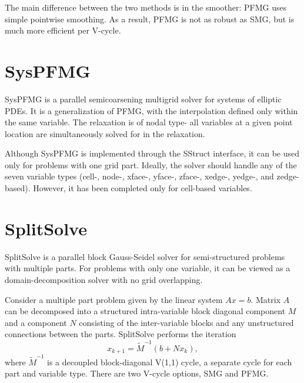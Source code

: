The main difference between the two methods is in the smoother: PFMG
uses simple pointwise smoothing.  As a result, PFMG is not as robust
as SMG, but is much more efficient per V-cycle.

                                                                                                                                                             
\section{SysPFMG}

SysPFMG is a parallel semicoarsening multigrid solver for systems of 
elliptic PDEs. It is a generalization of PFMG, with the interpolation
defined only within the same variable. The relaxation is of nodal type-
all variables at a given point location are simultaneously solved for in the
relaxation.

Although SysPFMG is implemented through the SStruct interface, it can
be used only for problems with one grid part. Ideally, the solver should
handle any of the seven variable types (cell-, node-, xface-, yface-, zface-,
xedge-, yedge-, and zedge-based). However, it has been completed only for cell-based
variables.


\section{SplitSolve}
                                                                                                                                                             
SplitSolve is a parallel block Gauss-Seidel solver for semi-structured
problems with multiple parts. For problems with only one variable, it can be viewed as 
a domain-decomposition solver with no grid overlapping.

Consider a multiple part problem given by the linear system $Ax=b$. Matrix $A$ can
be decomposed into a structured intra-variable block diagonal component $M$ and a
component $N$ consisting of the inter-variable blocks and any unstructured connections
between the parts. SplitSolve performs the iteration 
\[ x_{k+1} = \tilde{M}^{-1} (b + N x_k),\]
where $\tilde{M}^{-1}$ is a decoupled block-diagonal V(1,1) cycle, a separate cycle for each
part and variable type. There are two V-cycle options, SMG and PFMG.

